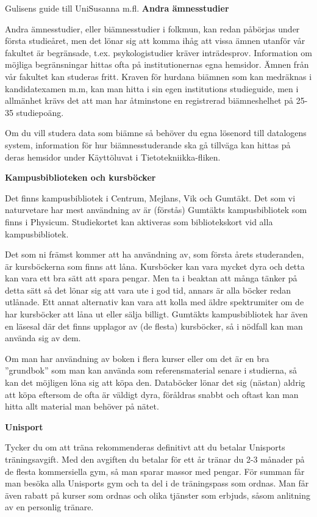 \documentclass{spektraklet}
\begin{document}
\begin{artikel}{Gulisens guide till Uni}{Susanna m.fl.}
\textbf{Andra ämnesstudier}

Andra ämnesstudier, eller biämnesstudier i folkmun, kan redan påbörjas under första
studieåret, men det lönar sig att komma ihåg att vissa ämnen utanför vår fakultet är begränsade, t.ex. psykologistudier kräver inträdesprov. Information om möjliga begränsningar hittas ofta på institutionernas egna hemsidor. Ämnen från vår fakultet kan studeras fritt. Kraven för hurdana biämnen som kan medräknas i kandidatexamen m.m, kan man hitta i sin egen institutions studieguide, men i allmänhet krävs det att man har åtminstone en registrerad biämneshelhet på 25-35 studiepoäng.
 
Om du vill studera data som biämne så behöver du egna lösenord till datalogens system, information för hur biämnesstuderande ska gå tillväga kan hittas på deras hemsidor under Käyttöluvat i Tietotekniikka-fliken.


\newpage 

\textbf{Kampusbiblioteken och kursböcker}

Det finns kampusbibliotek i Centrum, Mejlans, Vik och Gumtäkt. Det som vi naturvetare har mest användning av är (förstås) Gumtäkts kampusbibliotek som finns i Physicum. Studiekortet kan aktiveras som bibliotekskort vid alla kampusbibliotek.

Det som ni främst kommer att ha användning av, som första årets studeranden, är kursböckerna som finns att låna. Kursböcker kan vara mycket dyra och detta kan vara ett bra sätt att spara pengar. Men ta i beaktan att många tänker på detta sätt så det lönar sig att vara ute i god tid, annars är alla böcker redan utlånade. Ett annat alternativ kan vara att kolla med äldre spektrumiter om de har kursböcker att låna ut eller sälja billigt. 
Gumtäkts kampusbibliotek har även en läsesal där det finns upplagor av (de flesta) kursböcker, så i nödfall kan man använda sig av dem. 

Om man har användning av boken i flera kurser eller om det är en bra ”grundbok” som man kan använda som referensmaterial senare i studierna, så kan det möjligen löna sig att köpa den. Databöcker lönar det sig (nästan) aldrig att köpa eftersom de ofta är väldigt dyra, föråldras snabbt och oftast kan man hitta allt material man behöver på nätet.

\textbf{Unisport}

Tycker du om att träna rekommenderas definitivt att du betalar Unisports träningsavgift. Med den avgiften du betalar för ett år tränar du 2-3 månader på de flesta kommersiella gym, så man sparar massor med pengar. För summan får man besöka alla Unisports gym och ta del i de träningspass som ordnas. Man får även rabatt på kurser som ordnas och olika tjänster som erbjuds, såsom anlitning av en personlig tränare. 


\end{artikel}
\end{document}

